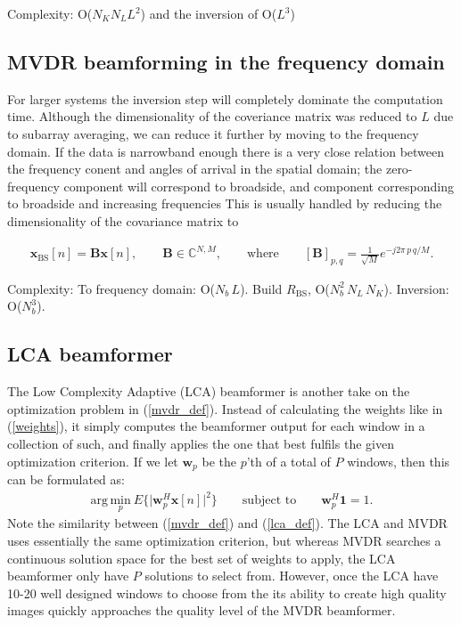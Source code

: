 \documentclass[
a4paper,10pt
]{ica2013_2}
\newcommand\argmin[1]{\text{arg}\,\underset{#1}{\text{min}}}
\renewcommand\H{^{\scriptscriptstyle H}}
\renewcommand\vec[1]{\boldsymbol{#1}}
\newcommand\mat[1]{\boldsymbol{#1}}
\newcommand\1{\vec 1}
\newcommand*\w{\vec w}
\newcommand*\x{\vec x}
\newcommand*\B{\mat B}
\renewcommand*\B{\mat B}
\begin{document}
Complexity: O($N_K N_L L^2$) and the inversion of O($L^3$)

\subsection{MVDR beamforming in the frequency domain}

For larger systems the inversion step will completely dominate the computation time. Although the dimensionality of the coveriance matrix was reduced to $L$ due to subarray averaging, we can reduce it further by moving to the frequency domain. If the data is narrowband enough there is a very close relation between the frequency conent and angles of arrival in the spatial domain; the zero-frequency component will correspond to broadside, and    component corresponding to broadside and increasing frequencies  This is usually handled by reducing the dimensionality of the covariance matrix to 

\begin{gather}
\x_\text{BS}[n] = \B\x[n], \qquad \B\in \mathbb{C}^{N,M}, \qquad \text{where} \qquad [\B]_{p,q} = \frac{1}{\sqrt{M}} e^{-j2\pi\,p\,q/M}.\label{beamspace}
\end{gather}

Complexity: To frequency domain: O($N_b\,L$). Build $R_\text{BS}$, O($N_b^2\,N_L\,N_K$). Inversion: O($N_b^3$).

\subsection{LCA beamformer}

The Low Complexity Adaptive (LCA) beamformer is another take on the optimization problem in (\ref{mvdr_def}). Instead of calculating the weights like in (\ref{weights}), it simply computes the beamformer output for each window in a collection of such, and finally applies the one that best fulfils the given optimization criterion. If we let $\w_p$ be the $p$'th of a total of $P$ windows, then this can be formulated as:
\begin{gather}
\argmin{p}\ E\Big\{\big|\w_p\H\x[n]\big|^2\Big\} \qquad\text{subject to}\qquad \w_p\H\1 = 1. \label{lca_def}
\end{gather}
Note the similarity between (\ref{mvdr_def}) and (\ref{lca_def}). The LCA and MVDR uses essentially the same optimization criterion, but whereas MVDR searches a continuous solution space for the best set of weights to apply, the LCA beamformer only have $P$ solutions to select from. However, once the LCA have 10-20 well designed windows to choose from the its ability to create high quality images quickly approaches the quality level of the MVDR beamformer.
\end{document}
